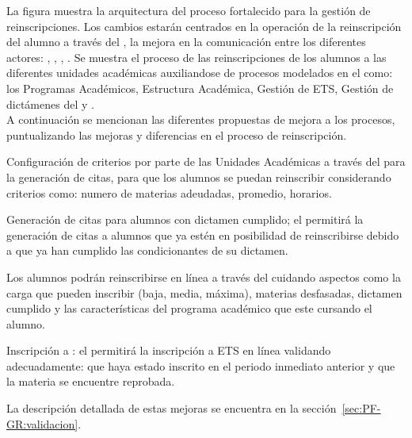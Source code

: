 
La figura  muestra la arquitectura del proceso fortalecido para la gestión de reinscripciones. Los cambios estarán centrados en la operación de la reinscripción del alumno a través del , la mejora en la comunicación entre los diferentes actores: , , , . Se muestra el proceso de las reinscripciones de los alumnos a las diferentes unidades académicas auxiliandose de procesos modelados en el  como: los Programas Académicos, Estructura Académica, Gestión de ETS, Gestión de dictámenes del  y .
\\
A continuación se mencionan las diferentes propuestas de mejora a los procesos, puntualizando las mejoras y diferencias en el proceso de reinscripción.

\begin{Citemize}
	\item Configuración de criterios por parte de las Unidades Académicas a través del  para la generación de citas, para que los alumnos se puedan reinscribir considerando criterios como: numero de materias adeudadas, promedio, horarios.
	\item Generación de citas para alumnos con dictamen cumplido; el  permitirá la generación de citas a alumnos que ya estén en posibilidad de reinscribirse debido a que ya han cumplido las condicionantes de su dictamen.
	\item Los alumnos podrán reinscribirse en línea a través del  cuidando aspectos como la carga que pueden inscribir (baja, media, máxima), materias desfasadas, dictamen cumplido y las características del programa académico que este cursando el alumno.
	\item Inscripción a : el  permitirá la inscripción a ETS en línea validando adecuadamente: que haya estado inscrito en el periodo inmediato anterior y que la materia se encuentre reprobada.
\end{Citemize}


La descripción detallada de estas mejoras se encuentra en la sección~\ref{sec:PF-GR:validacion}.

\pagebreak
